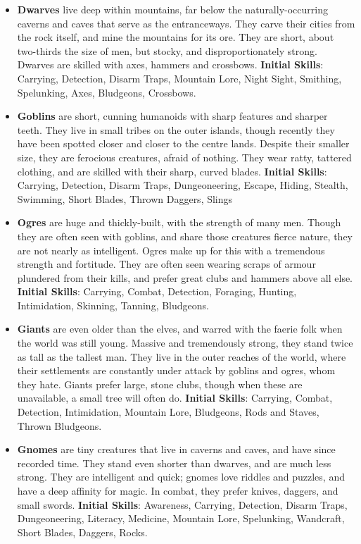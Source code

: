 \begin{itemize}
\item {\bf Dwarves} live deep within mountains, far below the 
naturally-occurring caverns and caves that serve as the entranceways.  They
carve their cities from the rock itself, and mine the mountains for its 
ore.  They are short, about two-thirds the size of men, but stocky, and 
disproportionately strong.  Dwarves are skilled with axes, hammers and 
crossbows. \textbf{Initial Skills}: Carrying, Detection, Disarm Traps,
Mountain Lore, Night Sight, Smithing, Spelunking, Axes, Bludgeons,
Crossbows.

\item {\bf Goblins} are short, cunning humanoids with sharp features and 
sharper teeth.  They live in small tribes on the outer islands, though 
recently they have been spotted closer and closer to the centre lands.   
Despite their smaller size, they are ferocious creatures, afraid of 
nothing.  They wear ratty, tattered clothing, and are skilled with their 
sharp, curved blades. \textbf{Initial Skills}: Carrying, Detection,
Disarm Traps, Dungeoneering, Escape, Hiding, Stealth, Swimming, Short
Blades, Thrown Daggers, Slings

\item {\bf Ogres} are huge and thickly-built, with the strength of many 
men.  Though they are often seen with goblins, and share those creatures 
fierce nature, they are not nearly as intelligent.  Ogres make up for this 
with a tremendous strength and fortitude.  They are often seen wearing 
scraps of armour plundered from their kills, and prefer great clubs and 
hammers above all else. \textbf{Initial Skills}: Carrying, Combat,
Detection, Foraging, Hunting, Intimidation, Skinning, Tanning, Bludgeons.

\item {\bf Giants} are even older than the elves, and warred with the 
faerie folk when the world was still young.  Massive and tremendously 
strong, they stand twice as tall as the tallest man.  They live in the 
outer reaches of the world, where their settlements are constantly under 
attack by goblins and ogres, whom they hate. Giants prefer large, stone 
clubs, though when these are unavailable, a small tree will often do.
\textbf{Initial Skills}: Carrying, Combat, Detection, Intimidation,
Mountain Lore, Bludgeons, Rods and Staves, Thrown Bludgeons.

\item {\bf Gnomes} are tiny creatures that live in caverns and caves, and 
have since recorded time.  They stand even shorter than dwarves, and are 
much less strong.  They are intelligent and quick; gnomes love riddles and 
puzzles, and have a deep affinity for magic.  In combat, they prefer knives,
daggers, and small swords. \textbf{Initial Skills}: Awareness, Carrying,
Detection, Disarm Traps, Dungeoneering, Literacy, Medicine, Mountain Lore, 
Spelunking, Wandcraft, Short Blades, Daggers, Rocks.
\end{itemize}


